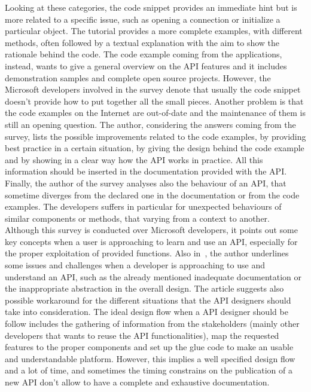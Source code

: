 Looking at these categories, the code snippet provides an immediate hint but is more related to a specific issue, such as opening a connection or initialize a particular object. The tutorial provides a more complete examples, with different methods, often followed by a textual explanation with the aim to show the rationale behind the code. The code example coming from the applications, instead, wants to give a general overview on the API features and it includes demonstration samples and complete open source projects. However, the Microsoft developers involved in the survey denote that usually the code snippet doesn't provide how to put together all the small pieces. Another problem is that the code examples on the Internet are out-of-date and the maintenance of them is still an opening question. The author, considering the answers coming from the survey, lists the possible improvements related to the code examples, by providing best practice in a certain situation, by giving the design behind the code example and by showing in a clear way how the API works in practice. All this information should be inserted in the documentation provided with the API.\\
Finally, the author of the survey analyses also the behaviour of an API, that sometime diverges from the declared one in the documentation or from the code examples. The developers suffers in particular for unexpected behaviours of similar components or methods, that varying from a context to another. Although this survey is conducted over Microsoft developers, it points out some key concepts when a user is approaching to learn and use an API, especially for the proper exploitation of provided functions.  \newline
Also in~\cite{by_christopher_scaffidi_why_2006}, the author underlines some issues and challenges when a developer is approaching to use and understand an API, such as the already mentioned inadequate documentation or the inappropriate abstraction in the overall design. The article suggests also possible workaround for the different situations that the API designers should take into consideration. The ideal design flow when a API designer should be follow includes the gathering of information from the stakeholders (mainly other developers that wants to reuse the API functionalities), map the requested features to the proper components and set up the glue code to make an usable and understandable platform. However, this implies a well specified design flow and a lot of time, and sometimes the timing constrains on the publication of a new API don't allow to have a complete and exhaustive documentation. \\
